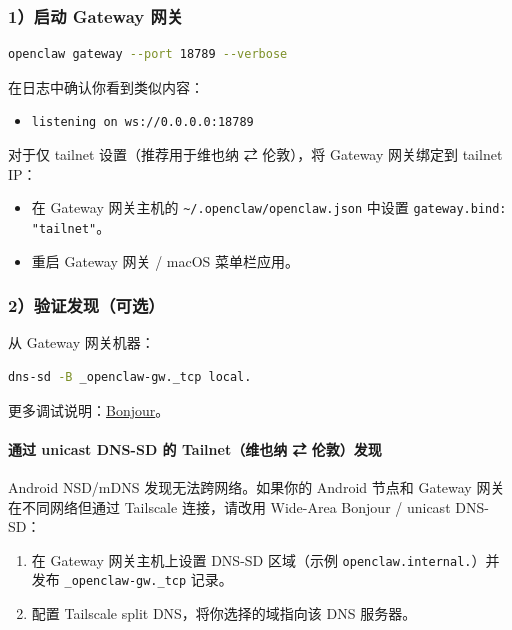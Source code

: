 \subsubsection{1）启动 Gateway 网关}


\begin{lstlisting}[language=bash]
openclaw gateway --port 18789 --verbose
\end{lstlisting}


在日志中确认你看到类似内容：

\begin{itemize}
  \item \texttt{listening on ws://0.0.0.0:18789}
\end{itemize}


对于仅 tailnet 设置（推荐用于维也纳 ⇄ 伦敦），将 Gateway 网关绑定到 tailnet IP：

\begin{itemize}
  \item 在 Gateway 网关主机的 \texttt{\textasciitilde{}/.openclaw/openclaw.json} 中设置 \texttt{gateway.bind: "tailnet"}。
  \item 重启 Gateway 网关 / macOS 菜单栏应用。
\end{itemize}


\subsubsection{2）验证发现（可选）}


从 Gateway 网关机器：

\begin{lstlisting}[language=bash]
dns-sd -B _openclaw-gw._tcp local.
\end{lstlisting}


更多调试说明：\href{/gateway/bonjour}{Bonjour}。

\paragraph{通过 unicast DNS-SD 的 Tailnet（维也纳 ⇄ 伦敦）发现}


Android NSD/mDNS 发现无法跨网络。如果你的 Android 节点和 Gateway 网关在不同网络但通过 Tailscale 连接，请改用 Wide-Area Bonjour / unicast DNS-SD：

\begin{enumerate}
  \item 在 Gateway 网关主机上设置 DNS-SD 区域（示例 \texttt{openclaw.internal.}）并发布 \texttt{\_openclaw-gw.\_tcp} 记录。
  \item 配置 Tailscale split DNS，将你选择的域指向该 DNS 服务器。
\end{enumerate}


